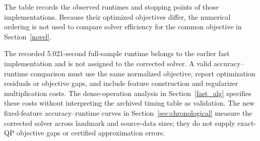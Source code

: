 {\color{blue}The table records the observed runtimes and stopping points of those implementations. Because their optimized objectives differ, the numerical ordering is not used to compare solver efficiency for the common objective in Section~\ref{novel}.}

{\color{blue}The recorded 5.021-second full-sample runtime belongs to the earlier fast implementation and is not assigned to the corrected solver. A valid accuracy--runtime comparison must use the same normalized objective, report optimization residuals or objective gaps, and include feature construction and regularizer multiplication costs. The dense-operation analysis in Section~\ref{fast_alg} specifies these costs without interpreting the archived timing table as validation. The new fixed-feature accuracy--runtime curves in Section~\ref{sec:chronological} measure the corrected solver across landmark and source-data sizes; they do not supply exact-QP objective gaps or certified approximation errors.}



